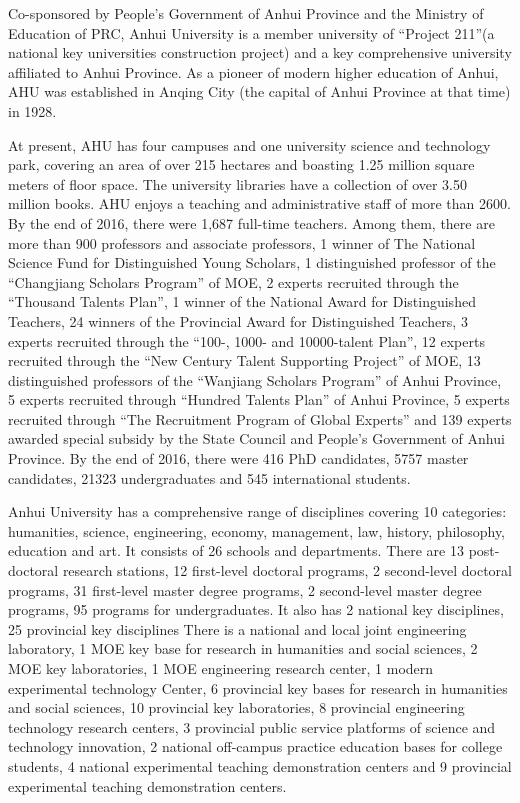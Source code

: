 Co-sponsored by People’s Government of Anhui Province and the Ministry of Education of PRC, Anhui University is a member university of “Project 211”(a national key universities construction project) and a key comprehensive university affiliated to Anhui Province. As a pioneer of modern higher education of Anhui, AHU was established in Anqing City (the capital of Anhui Province at that time) in 1928.

At present, AHU has four campuses and one university science and technology park, covering an area of over 215 hectares and boasting 1.25 million square meters of floor space. The university libraries have a collection of over 3.50 million books. AHU enjoys a teaching and administrative staff of more than 2600. By the end of 2016, there were 1,687 full-time teachers. Among them, there are more than 900 professors and associate professors, 1 winner of The National Science Fund for Distinguished Young Scholars, 1 distinguished professor of the  “Changjiang Scholars Program” of MOE, 2 experts recruited through the “Thousand Talents Plan”, 1 winner of the National Award for Distinguished Teachers, 24 winners of the Provincial Award for Distinguished Teachers, 3 experts recruited through the “100-, 1000- and 10000-talent Plan”, 12 experts recruited through the “New Century Talent Supporting Project” of MOE, 13 distinguished professors of the “Wanjiang Scholars Program” of Anhui Province, 5 experts recruited through “Hundred Talents Plan” of Anhui Province, 5 experts recruited through “The Recruitment Program of Global Experts” and 139 experts awarded special subsidy by the State Council and People’s Government of Anhui Province. By the end of 2016, there were 416 PhD candidates, 5757 master candidates, 21323 undergraduates and 545 international students.

Anhui University has a comprehensive range of disciplines covering 10 categories: humanities, science, engineering, economy, management, law, history, philosophy, education and art. It consists of 26 schools and departments. There are 13 post-doctoral research stations, 12 first-level doctoral programs, 2 second-level doctoral programs, 31 first-level master degree programs, 2 second-level master degree programs, 95 programs for undergraduates. It also has 2 national key disciplines, 25 provincial key disciplines There is a national and local joint engineering laboratory, 1 MOE key base for research in humanities and social sciences, 2 MOE key laboratories, 1 MOE engineering research center, 1 modern experimental technology Center, 6 provincial key bases for research in humanities and social sciences, 10 provincial key laboratories, 8 provincial engineering technology research centers, 3 provincial public service platforms of science and technology innovation, 2 national off-campus practice education bases for college students, 4 national experimental teaching demonstration centers and 9 provincial experimental teaching demonstration centers.